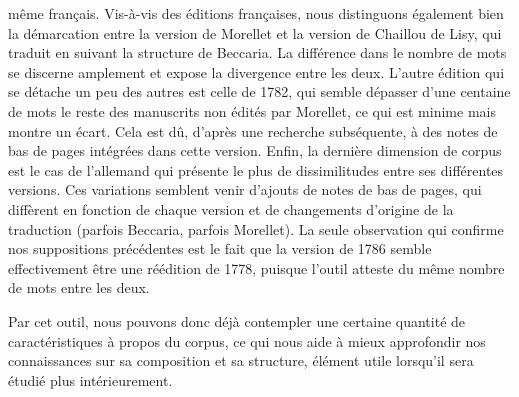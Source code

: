 même français. Vis-à-vis des éditions françaises, nous distinguons également bien la démarcation entre la version de Morellet et la version de Chaillou de Lisy, qui traduit en suivant la structure de Beccaria. La différence dans le nombre de mots se discerne amplement et expose la divergence entre les deux. L'autre édition qui se détache un peu des autres est celle de 1782, qui semble dépasser d'une centaine de mots le reste des manuscrits non édités par Morellet, ce qui est minime mais montre un écart. Cela est dû, d'après une recherche subséquente, à des notes de bas de pages intégrées dans cette version. Enfin, la dernière dimension de corpus est le cas de l'allemand qui présente le plus de dissimilitudes entre ses différentes versions. Ces variations semblent venir d'ajouts de notes de bas de pages, qui diffèrent en fonction de chaque version et de changements d'origine de la traduction (parfois Beccaria, parfois Morellet). La seule observation qui confirme nos suppositions précédentes est le fait que la version de 1786 semble effectivement être une réédition de 1778, puisque l'outil atteste du même nombre de mots entre les deux.

Par cet outil, nous pouvons donc déjà contempler une certaine quantité de caractéristiques à propos du corpus, ce qui nous aide à mieux approfondir nos connaissances sur sa composition et sa structure, élément utile lorsqu'il sera étudié plus intérieurement.

